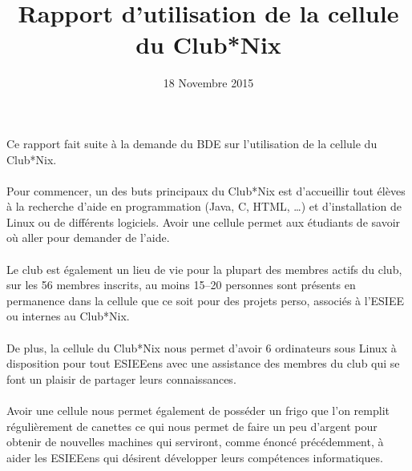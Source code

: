 \documentclass[11pt]{article}
\title{Rapport d'utilisation de la cellule du Club*Nix}
\date{18 Novembre 2015}
\begin{document}
\maketitle

\paragraph{} Ce rapport fait suite à la demande du BDE sur l'utilisation de la
cellule du Club*Nix.

\paragraph{} Pour commencer, un des buts principaux du Club*Nix est
d'accueillir tout élèves à la recherche d'aide en programmation (Java, C, HTML,
\ldots) et d'installation de Linux ou de différents logiciels. Avoir une cellule
permet aux étudiants de savoir où aller pour demander de l'aide.

\paragraph{} Le club est également un lieu de vie pour la plupart des membres
actifs du club, sur les 56 membres inscrits, au moins 15--20 personnes sont
présents en permanence dans la cellule que ce soit pour des projets perso,
associés à l'ESIEE ou internes au Club*Nix.


\paragraph{} De plus, la cellule du Club*Nix nous permet d'avoir 6 ordinateurs
sous Linux à disposition pour tout ESIEEens avec une assistance des membres du
club qui se font un plaisir de partager leurs connaissances.

\paragraph{} Avoir une cellule nous permet également de posséder un frigo que
l'on remplit régulièrement de canettes ce qui nous permet de faire un peu
d'argent pour obtenir de nouvelles machines qui serviront, comme énoncé
précédemment, à aider les ESIEEens qui désirent développer leurs compétences
informatiques.
\end{document}
